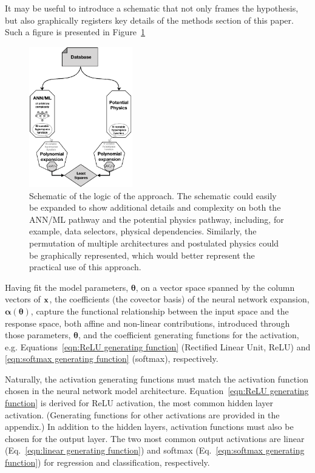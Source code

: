 It may be useful to introduce a schematic that not only frames the hypothesis, but also graphically registers key details of the methods section of this paper.  Such a figure is presented in Figure~\ref{fig:nn-2}


\begin{figure}[htbp]
\begin{center}
\includegraphics[width=0.4\textwidth]{fig/Schematic-02}
\caption{Schematic of the logic of the approach. The schematic could easily be expanded to show additional details and complexity on both the ANN/ML pathway and the potential physics pathway, including, for example, data selectors, physical dependencies. Similarly, the permutation of multiple architectures and postulated physics could be graphically represented, which would better represent the practical use of this approach.}
\label{fig:nn-2}
\end{center}
\end{figure}


Having fit the model parameters, $\boldsymbol{\theta}$, on a vector space spanned by the column vectors of ${\bf x}$, the coefficients (the covector basis) of the neural network expansion, $\boldsymbol{\alpha}(\boldsymbol{\theta})$, capture the functional relationship between the input space and the response space, both affine and non-linear contributions, introduced through those parameters, $\boldsymbol{\theta}$, and the coefficient generating functions for the activation, e.g. Equations~\ref{eqn:ReLU generating function} (Rectified Linear Unit, ReLU) and \ref{eqn:softmax generating function} (softmax), respectively.

Naturally, the activation generating functions must match the activation function chosen in the neural network model architecture. Equation~\ref{eqn:ReLU generating function} is derived for ReLU activation, the most common hidden layer activation. (Generating functions for other activations are provided in the appendix.) In addition to the hidden layers, activation functions must also be chosen for the output layer. The two most common output activations are linear (Eq.~\ref{eqn:linear generating function}) and softmax (Eq.~\ref{eqn:softmax generating function}) for regression and classification, respectively.

